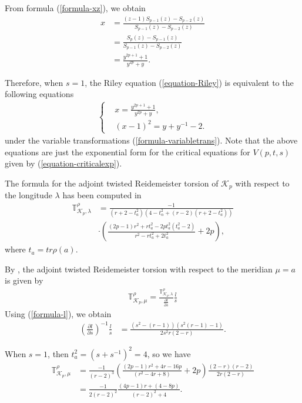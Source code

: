 \documentclass[12pt]{amsart}
\begin{document}
From formula (\ref{formula-xz}), we obtain
\begin{align}
    x&=\frac{(z-1)S_{p-1}(z)-S_{p-2}(z)}{S_{p-1}(z)-S_{p-2}(z)}\\\nonumber
    &=\frac{S_{p}(z)-S_{p-1}(z)}{S_{p-1}(z)-S_{p-2}(z)}\\\nonumber
    &=\frac{y^{2p+1}+1}{y^{2p}+y}.
\end{align}

Therefore, when $s=1$, the Riley equation (\ref{equation-Riley}) is equivalent to the following equations
\begin{align} \label{equation-Riley1}
 \left\{ \begin{aligned}
     &x=\frac{y^{2p+1}+1}{y^{2p}+y}, \\
      &(x-1)^2=y+y^{-1}-2.
                          \end{aligned} \right.   
\end{align}
under the variable transformations (\ref{formula-variabletrans}). 
Note that the above equations are just the exponential form for the critical equations for $V(p,t,s)$ given by (\ref{equation-criticalexp}).



The formula for the adjoint twisted Reidemeister torsion of $\mathcal{K}_p$ with respect to the longitude $\lambda$ has been computed  in \cite{Tr14} 
\begin{align}
\mathbb{T}_{\mathcal{K}_p,\lambda}^{\rho}&=\frac{-1}{(r+2-t_{a}^2)(4-t_{\alpha}^2+(r-2)(r+2-t_a^2))}\\\nonumber
&\cdot\left(\frac{(2p-1)r^2+rt_{a}^2-2pt_{a}^2(t_{a}^2-2)}{r^2-rt_{a}^2+2t_{a}^2}+2p\right),
\end{align}
where  $t_{a}=tr\rho(a)$. 


By \cite{Porti97}, the adjoint twisted Reidemeister torsion with respect to the meridian $\mu=a$ is given by  
\begin{align}
    \mathbb{T}_{\mathcal{K}_p,\mu}^{\rho}=\frac{\mathbb{T}_{\mathcal{K}_p,\lambda}^{\rho}}{\frac{\partial l}{\partial s}}\frac{l}{s}
\end{align}
Using (\ref{formula-l}), we obtain 
\begin{align}
    \left(\frac{\partial l}{\partial s}\right)^{-1}\frac{l}{s}
    &=\frac{(s^2-(r-1))(s^2(r-1)-1)}{2s^2r(2-r)}.
\end{align}

When $s=1$, then $t_{a}^2=(s+s^{-1})^2=4$, so we have
\begin{align}
\mathbb{T}_{\mathcal{K}_p,\mu}^{\rho}&=\frac{-1}{(r-2)^3}\left(\frac{(2p-1)r^2+4r-16p}{(r^2-4r+8)}+2p\right)\frac{(2-r)(r-2)}{2r(2-r)}\\\nonumber
    &=\frac{-1}{2(r-2)^2}\frac{(4p-1)r+(4-8p)}{(r-2)^2+4}.
\end{align}
\end{document}
